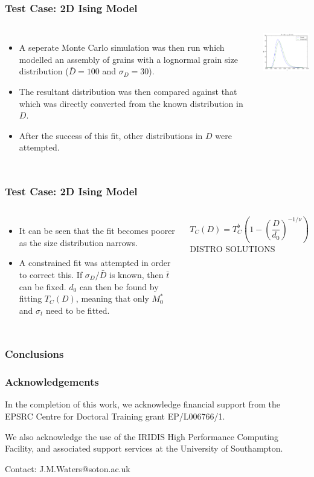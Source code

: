 \documentclass{beamer}
\begin{document}
\begin{frame}
	\frametitle{Test Case: 2D Ising Model}
	\begin{columns}
	\column{7cm}
		\begin{itemize}
		\item{A seperate Monte Carlo simulation was then run which modelled an assembly of grains with a lognormal grain size distribution ($\bar{D}=100$ and $\sigma_D=30$).}
		\item{The resultant distribution was then compared against that which was directly converted from the known distribution in $D$.}
		\item{After the success of this fit, other distributions in $D$ were attempted.}
		\end{itemize}
	\column{5cm}
		\includegraphics[width=5cm]{Images/t_dist}
	\end{columns}
\end{frame}

\begin{frame}
	\frametitle{Test Case: 2D Ising Model}
	\begin{columns}
	\column{7cm}
		\begin{itemize}
		\item{It can be seen that the fit becomes poorer as the size distribution narrows.}
		\item{A constrained fit was attempted in order to correct this. If $\sigma_D/\bar{D}$ is known, then $\bar{t}$ can be fixed. $d_0$ can then be found by fitting $T_C(D)$, meaning that only $M_0^*$ and $\sigma_t$ need to be fitted.}
		\end{itemize}
		$$
		T_C(D) = T_C^b\left(1 - \left(\frac{D}{d_0}\right)^{-1/\nu}\right)
		$$
	\column{5cm}
		DISTRO SOLUTIONS
	\end{columns}
\end{frame}

\begin{frame}
	\frametitle{Conclusions}
\end{frame}

\begin{frame}
	\frametitle{Acknowledgements}
	In the completion of this work, we acknowledge financial support from the EPSRC Centre for Doctoral Training grant EP/L006766/1. \newline
	
	We also acknowledge the use of the IRIDIS High Performance Computing Facility, and associated support services at the University of
Southampton. \newline

	Contact: J.M.Waters@soton.ac.uk
\end{frame}
\end{document}
